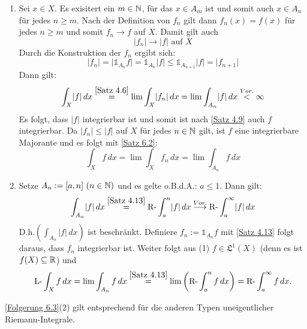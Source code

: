 \documentclass[a4paper,twoside,DIV15,BCOR12mm,chapterprefix=true,headings=onelinechapter]{scrbook}
\begin{document}
\begin{beweis}
\begin{enumerate}
	\item 	Sei \(x\in X\). Es exisitert ein $m\in\mathbb{N}$, für das \(x\in A_m\) ist und somit auch \(x\in A_n \) für jedes \(n\geq m\). Nach der Definition von $f_n$ gilt dann \(f_n(x)=f(x)\) für jedes 				\(n\geq m\) und somit \(f_n\to f\) auf $X$. Damit gilt auch \[\lvert f_n\rvert\to\lvert f\rvert \text{ auf } X\] Durch die Konstruktion der $f_n$ ergibt sich: 
		\[ \lvert f_n\rvert=\lvert \mathds{1}_{A_n}f\rvert=\mathds{1}_{A_n}\lvert f\rvert \leq \mathds{1}_{A_{n+1}}\lvert f\rvert=\lvert f_{n+1}\rvert \]
		Dann gilt:
		\[ \int_X \lvert f\rvert\,dx \overset{\ref{Satz 4.6}}=\lim\int_X \lvert f_n\rvert\,dx = \lim\int_{A_n} \lvert f\rvert\,dx \overset{Vor.}<\infty \]
		Es folgt, dass \(\lvert f\rvert\) integrierbar ist und somit ist nach \ref{Satz 4.9} auch $f$ integrierbar. Da \(\lvert f_n\rvert \leq \lvert f\rvert\) auf $X$ für jedes \(n\in\mathbb{N}\) gilt, ist $f$ eine 		
		integrierbare Majorante und es folgt mit \ref{Satz 6.2}:
		\[ \int_Xf\,dx = \lim\int_Xf_n\,dx = \lim\int_{A_n}f\,dx \]
	\item 	Setze \(A_n:=[a,n]\ (n\in\mathbb{N})\) und es gelte o.B.d.A.: \(a\leq 1\). Dann gilt:
		\[ \int_{A_n}\lvert f\rvert\,dx \overset{\ref{Satz 4.13}}= \text{R-}\int^n_a \lvert f\rvert\,dx \overset{Vor.}\longrightarrow \text{R-}\int^\infty_a \lvert f\rvert\,dx \]
		D.h.\(\left(\int_{A_n}\lvert f\rvert\,dx\right)\) ist beschränkt. Definiere \(f_n:=\mathds{1}_{A_n}f\) mit \ref{Satz 4.13} folgt daraus, dass $f_n$ integrierbar ist. Weiter folgt
		aus (1) \(f\in\mathfrak{L}^1(X)\) (denn es ist \(f(X)\subseteq\mathbb{R}\)) und 
		\[ \text{L-}\int_Xf\,dx = \lim\int_{A_n}f\,dx \overset{\ref{Satz 4.13}}= \lim\left(\text{R-}\int^n_a f\,dx \right) = \text{R-}\int^\infty_a f\,dx. \]
\end{enumerate}
\end{beweis}

\begin{bemerkung}
\ref{Folgerung 6.3}(2) gilt entsprechend für die anderen Typen uneigentlicher Riemann-Integrale.
\end{bemerkung}
\end{document}
